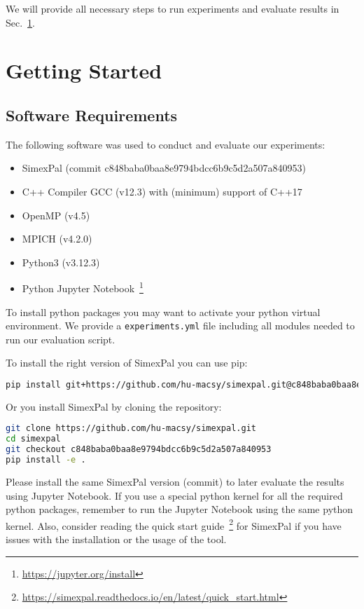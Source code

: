 \documentclass[11pt, a4paper]{scrartcl}
\newcommand{\expfile}{\texttt{experiments.yml} file\xspace}
\begin{document}
We will provide all necessary steps to run experiments and evaluate
results in Sec.~\ref{sec:getting_started}.

\section{Getting Started}\label{sec:getting_started}

\subsection{Software Requirements}

The following software was used to conduct and evaluate our experiments:

\begin{itemize}
    \item SimexPal (commit c848baba0baa8e9794bdcc6b9c5d2a507a840953)
    \item C++ Compiler GCC (v12.3) with (minimum) support of C++17
    \item OpenMP (v4.5)
    \item MPICH (v4.2.0)
    \item Python3 (v3.12.3)
    \item Python Jupyter Notebook~\footnote{\url{https://jupyter.org/install}}
\end{itemize}

To install python packages you may want to activate your python virtual
environment. We provide a \expfile including all modules
needed to run our evaluation script.

To install the right version of SimexPal you can use pip:

\begin{lstlisting}[language=bash]
pip install git+https://github.com/hu-macsy/simexpal.git@c848baba0baa8e9794bdcc6b9c5d2a507a840953
\end{lstlisting}

Or you install SimexPal by cloning the repository:

\begin{lstlisting}[language=bash]
git clone https://github.com/hu-macsy/simexpal.git
cd simexpal
git checkout c848baba0baa8e9794bdcc6b9c5d2a507a840953
pip install -e .
\end{lstlisting}

Please install the same SimexPal version (commit) to later evaluate the results
using Jupyter Notebook. If you use a special python kernel for all the required
python packages, remember to run the Jupyter Notebook using the same python
kernel. Also, consider reading the quick start
guide~\footnote{\url{https://simexpal.readthedocs.io/en/latest/quick_start.html}}
for SimexPal if you have issues with the installation or the usage of the tool.
\end{document}
